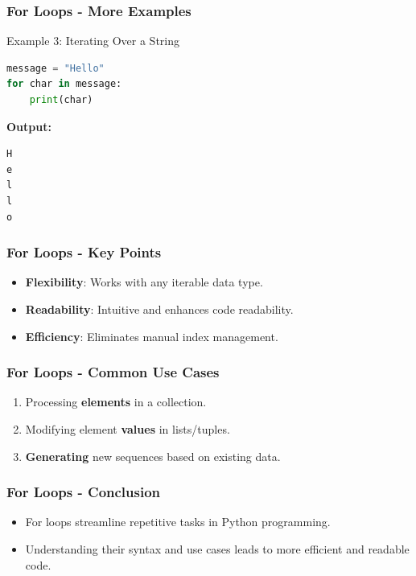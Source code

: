 \documentclass{beamer}
\begin{document}
\begin{frame}[fragile]
    \frametitle{For Loops - More Examples}
    \begin{block}{Example 3: Iterating Over a String}
        \begin{lstlisting}[language=Python]
message = "Hello"
for char in message:
    print(char)
        \end{lstlisting}
        \textbf{Output:}
        \begin{verbatim}
H
e
l
l
o
        \end{verbatim}
    \end{block}
\end{frame}

\begin{frame}[fragile]
    \frametitle{For Loops - Key Points}
    \begin{itemize}
        \item \textbf{Flexibility}: Works with any iterable data type.
        \item \textbf{Readability}: Intuitive and enhances code readability.
        \item \textbf{Efficiency}: Eliminates manual index management.
    \end{itemize}
\end{frame}

\begin{frame}[fragile]
    \frametitle{For Loops - Common Use Cases}
    \begin{enumerate}
        \item Processing \textbf{elements} in a collection.
        \item Modifying element \textbf{values} in lists/tuples.
        \item \textbf{Generating} new sequences based on existing data.
    \end{enumerate}
\end{frame}

\begin{frame}[fragile]
    \frametitle{For Loops - Conclusion}
    \begin{itemize}
        \item For loops streamline repetitive tasks in Python programming.
        \item Understanding their syntax and use cases leads to more efficient and readable code.
    \end{itemize}
\end{frame}
\end{document}
